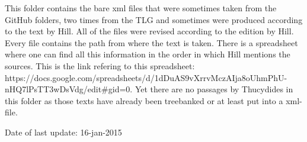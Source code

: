 This folder contains the bare xml files that were sometimes taken from the GitHub folders, two times from the TLG and sometimes were produced according to the text by Hill. All of the files were revised according to the edition by Hill. Every file contains the path from where the text is taken. 
There is a spreadsheet where one can find all this information in the order in which Hill mentions the sources. This is the link refering to this spreadsheet: https://docs.google.com/spreadsheets/d/1dDuAS9vXrrvMczAIja8oUhmPhU-nHQ7lPsTT3wDsVdg/edit#gid=0.
Yet there are no passages by Thucydides in this folder as those texts have already been treebanked or at least put into a xml-file.

Date of last update: 16-jan-2015